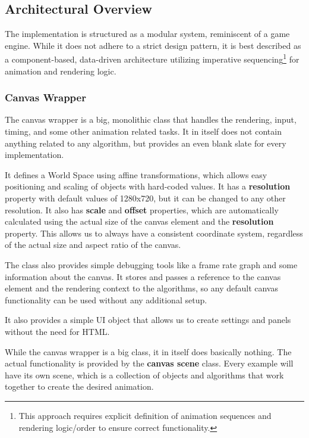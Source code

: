 \pagebreak

\subsection{Architectural Overview}
\label{subsec:architectural-overview}

The implementation is structured as a modular system, reminiscent of a game engine. While it does not adhere to a strict design pattern, it is best described as a component-based, data-driven architecture utilizing imperative sequencing\footnote{This approach requires explicit definition of animation sequences and rendering logic/order to ensure correct functionality.} for animation and rendering logic.

\vspace{45pt}

\subsubsection{Canvas Wrapper}
\label{subsubsec:canvas-wrapper}

The canvas wrapper is a big, monolithic class that handles the rendering, input, timing, and some other animation related tasks. It in itself does not contain anything related to any algorithm, but provides an even blank slate for every implementation.

It defines a World Space using affine transformations, which allows easy positioning and scaling of objects with hard-coded values. It has a \textbf{resolution} property with default values of 1280x720, but it can be changed to any other resolution. It also has \textbf{scale} and \textbf{offset} properties, which are automatically calculated using the actual size of the canvas element and the \textbf{resolution} property. This allows us to always have a consistent coordinate system, regardless of the actual size and aspect ratio of the canvas.

The class also provides simple debugging tools like a frame rate graph and some information about the canvas. It stores and passes a reference to the canvas element and the rendering context to the algorithms, so any default canvas functionality can be used without any additional setup.

It also provides a simple UI object that allows us to create settings and panels without the need for HTML.

While the canvas wrapper is a big class, it in itself does basically nothing. The actual functionality is provided by the \textbf{canvas scene} class. Every example will have its own scene, which is a collection of objects and algorithms that work together to create the desired animation.

